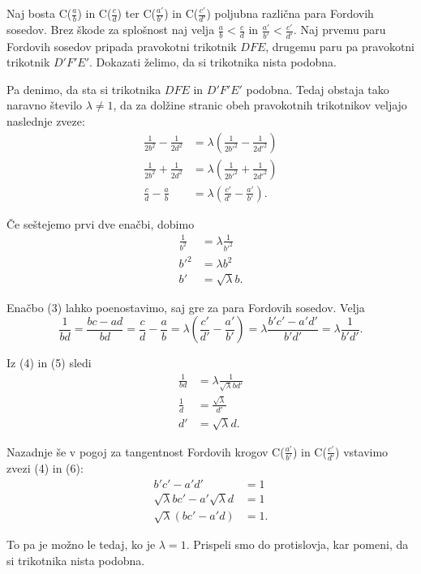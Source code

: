\documentclass[mat1]{fmfdelo}
\begin{document}
\begin{dokaz}
%
Naj bosta C($\frac{a}{b}$) in C($\frac{c}{d}$) ter C($\frac{a'}{b'}$) in C($\frac{c'}{d'}$) poljubna različna para Fordovih sosedov. Brez škode za splošnost naj velja $\frac{a}{b}<\frac{c}{d}$ in $\frac{a'}{b'}<\frac{c'}{d'}$. Naj prvemu paru Fordovih sosedov pripada pravokotni trikotnik $DFE$, drugemu paru pa pravokotni trikotnik $D'F'E'$. Dokazati želimo, da si trikotnika nista podobna.

Pa denimo, da sta si trikotnika $DFE$ in $D'F'E'$ podobna. Tedaj obstaja tako naravno število $\lambda\ne{1}$, da za dolžine stranic obeh pravokotnih trikotnikov veljajo naslednje zveze:
%
\begin{align}
\frac{1}{2b^2}-\frac{1}{2d^2} &= \lambda \left (\frac{1}{2b'^2}-\frac{1}{2d'^2} \right ) \\
\frac{1}{2b^2}+\frac{1}{2d^2} &= \lambda \left (\frac{1}{2b'^2}+\frac{1}{2d'^2} \right ) \\
\frac{c}{d}-\frac{a}{b} &= \lambda \left (\frac{c'}{d'}-\frac{a'}{b'} \right ).
\end{align}

Če seštejemo prvi dve enačbi, dobimo
%
\begin{align}
\frac{1}{b^2} &= \lambda \frac{1}{b'^2} \nonumber \\
b'^2 &= \lambda b^2 \nonumber \\
b' &= \sqrt\lambda b.
\end{align}

Enačbo (3) lahko poenostavimo, saj gre za para Fordovih sosedov. Velja
\begin{equation}
\frac{1}{bd} = \frac{bc-ad}{bd} = \frac{c}{d}-\frac{a}{b} = \lambda \left (\frac{c'}{d'}-\frac{a'}{b'} \right ) = \lambda \frac{b'c'-a'd'}{b'd'} = \lambda \frac{1}{b'd'}.
\end{equation}

Iz (4) in (5) sledi 
%
\begin{align}
\frac{1}{bd} &=\lambda \frac{1}{\sqrt\lambda bd'} \nonumber \\
\frac{1}{d} &= \frac{\sqrt\lambda}{d'} \nonumber \\
d' &= \sqrt\lambda d.
\end{align}

Nazadnje še v pogoj za tangentnost Fordovih krogov C($\frac{a'}{b'}$) in C($\frac{c'}{d'}$) vstavimo zvezi (4) in (6):
%
\begin{align}
b'c'-a'd' &= 1 \nonumber \\
\sqrt\lambda bc' - a' \sqrt\lambda d &= 1 \nonumber \\
\sqrt\lambda (bc'-a'd) &= 1.
\end{align}

To pa je možno le tedaj, ko je $\lambda=1.$ Prispeli smo do protislovja, kar pomeni, da si trikotnika nista podobna.
%
\end{dokaz}
\end{document}
